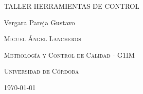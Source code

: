 \documentclass{article}
\author{Gustavo Vergara}
\theoremstyle{mytheoremstyle}
\theoremstyle{mytheoremstyle}
\theoremstyle{myproblemstyle}
\begin{document}
\pgfplotsset{compat=1.18}

\begin{titlepage}
	\centering
	\vspace{2.5cm}
	{\scshape \Large TALLER HERRAMIENTAS DE CONTROL \par}
	\vspace{5cm}
	\textbf\large\scshape{\par}
	\vspace{0.5cm}

	{\Large Vergara Pareja Gustavo\par}
	\vspace{5cm}
	{\scshape\Large Miguel Ángel Lancheros\par}
	\vspace{0.3cm}
	{\scshape\Large Metrología y Control de Calidad - G1IM \par}
	\vspace{0.3cm}
	{\scshape\Large Universidad de Córdoba\par}
	\vspace{0.3cm}
	{\Large \today \par}
\end{titlepage}
\newpage
\end{document}
